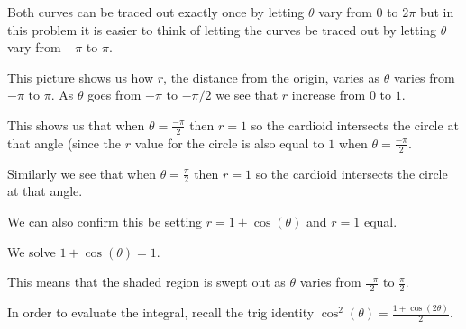 \documentclass{ximera}
\begin{document}
\begin{exercise}
\begin{hint}
\begin{image}  
\end{image} 

Both curves can be traced out exactly once by letting $\theta$ vary from $0$ to $2\pi$ but in this problem it is easier to think of letting the curves be traced out by letting $\theta$ vary from $-\pi$ to $\pi$. 

This picture shows us how $r$, the distance from the origin, varies as $\theta$ varies from $-\pi$ to $\pi$. As $\theta$ goes from $-\pi$ to $-\pi/2$ we see that $r$ increase from $0$ to $1$. 

This shows us that when $\theta=\frac{-\pi}{2}$ then $r=1$ so the cardioid intersects the circle at that angle (since the $r$ value for the circle is also equal to $1$ when $\theta=\frac{-\pi}{2}$. 

Similarly we see that when $\theta=\frac{\pi}{2}$ then $r=1$ so the cardioid intersects the circle at that angle. 

We can also confirm this be setting $r=1+\cos(\theta)$ and $r=1$ equal. 

We solve $1+\cos(\theta)=1$. 



This means that the shaded region is swept out as $\theta$ varies from $\frac{-\pi}{2}$ to $\frac{\pi}{2}$. 




In order to evaluate the integral, recall the trig identity $\cos^2(\theta)=\frac{1+\cos(2\theta)}{2}$. 










\end{hint}

\end{exercise}
\end{document}
